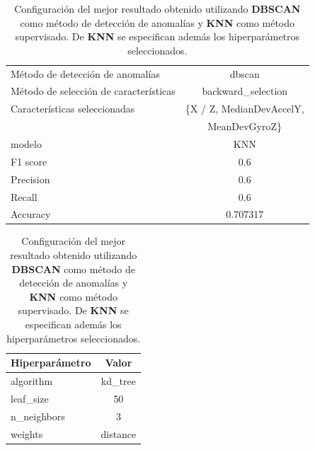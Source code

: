 \begin{appendices}
		\begin{table}[htb]
			\caption{Configuración del mejor resultado obtenido utilizando \textbf{DBSCAN} como método de detección de anomalías y \textbf{KNN}
			como método supervisado. De \textbf{KNN} se especifican además los hiperparámetros seleccionados.}
			\label{table:19}
			\centering
			\begin{tabular}{lc}
				\toprule
				      Método de detección de anomalías &                                 dbscan \\
				Método de selección de características &                     backward\_selection \\
				         Características seleccionadas & \{X / Z, MedianDevAccelY,               \\
						 							   &                   MeanDevGyroZ\} \\
				                                modelo &                                    KNN \\
				                              F1 score &                                    0.6 \\
				                             Precision &                                    0.6 \\
				                                Recall &                                    0.6 \\
				                              Accuracy &                               0.707317 \\
				\bottomrule
			\end{tabular}
			\newline
			\newline

			\begin{tabular}{lc}
				\toprule
				Hiperparámetro &    Valor \\
				\midrule
					 algorithm &  kd\_tree \\
					 leaf\_size &       50 \\
				   n\_neighbors &        3 \\
					   weights & distance \\
				\bottomrule
			\end{tabular}
			
			
		\end{table}


\end{appendices}
